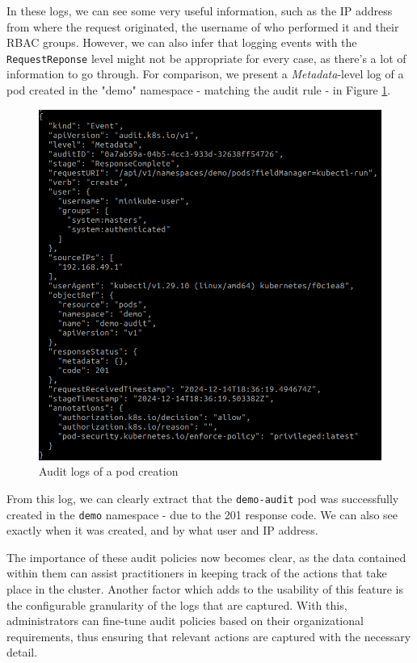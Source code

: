 \documentclass[a4paper,11pt,openright,BCOR=15mm]{scrbook}
\begin{document}
In these logs, we can see some very useful information, such as the IP address from where the request originated, the username of who performed it and their RBAC groups. However, we can also infer that logging events with the \texttt{RequestReponse} level might not be appropriate for every case, as there's a lot of information to go through. For comparison, we present a \textit{Metadata}-level log of a pod created in the "demo" namespace - matching the audit rule - in Figure \ref{fig:audit-pod}.

\begin{figure}[h!]
	\centering
	\includegraphics[scale=0.4]{figs/audit-pod-create.png}
	\caption{Audit logs of a pod creation}
	\label{fig:audit-pod}
\end{figure}

From this log, we can clearly extract that the \texttt{demo-audit} pod was successfully created in the \texttt{demo} namespace - due to the 201 response code. We can also see exactly when it was created, and by what user and IP address.

The importance of these audit policies now becomes clear, as the data contained within them can assist practitioners in keeping track of the actions that take place in the cluster. Another factor which adds to the usability of this feature is the configurable granularity of the logs that are captured. With this, administrators can fine-tune audit policies based on their organizational requirements, thus ensuring that relevant actions are captured with the necessary detail.
\end{document}
